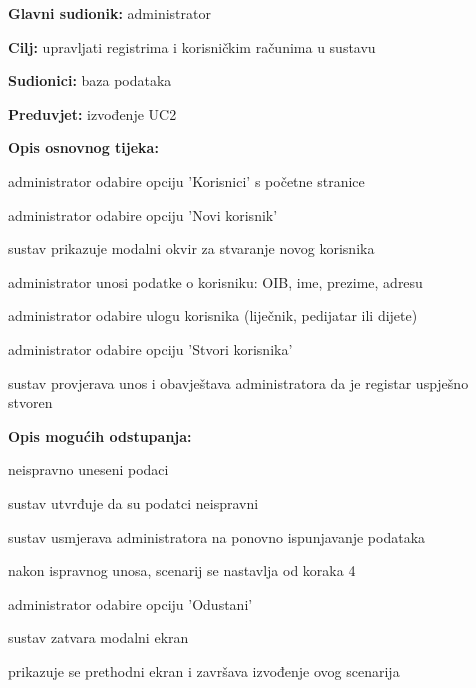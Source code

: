                     \noindent {}
					\begin{packed_item}
	
						\item \textbf{Glavni sudionik: }administrator
						\item  \textbf{Cilj:} upravljati registrima i korisničkim računima u sustavu
						\item  \textbf{Sudionici:} baza podataka
						\item  \textbf{Preduvjet:} izvođenje UC2
						\item  \textbf{Opis osnovnog tijeka:}
						
						\item[] \begin{packed_enum}
							\item administrator odabire opciju 'Korisnici' s početne stranice
							\item administrator odabire opciju 'Novi korisnik'
							\item sustav prikazuje modalni okvir za stvaranje novog korisnika
							\item administrator unosi podatke o korisniku: OIB, ime, prezime, adresu
							\item administrator odabire ulogu korisnika (liječnik, pedijatar ili dijete)
							\item administrator odabire opciju 'Stvori korisnika'
							\item sustav provjerava unos i obavještava administratora da je registar uspješno stvoren

						\end{packed_enum}

						\item  \textbf{Opis mogućih odstupanja:}
						
						\item[] \begin{packed_item}
                            \item[7.a] neispravno uneseni podaci
                            \item[] \begin{packed_enum}
                            	\item sustav utvrđuje da su podatci neispravni
								\item sustav usmjerava administratora na ponovno ispunjavanje podataka
								\item nakon ispravnog unosa, scenarij se nastavlja od koraka 4
							\end{packed_enum}
							\item[8.a] administrator odabire opciju 'Odustani'
							\item[] \begin{packed_enum}
								\item sustav zatvara modalni ekran
								\item prikazuje se prethodni ekran i završava izvođenje ovog scenarija
							\end{packed_enum}
						\end{packed_item}
						
					\end{packed_item}

